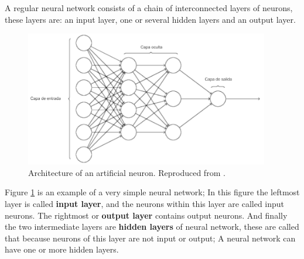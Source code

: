 A regular neural network consists of a chain of interconnected layers of neurons, these layers are: an input layer, one or several hidden layers and an output layer.

\begin{figure}[h!]
  \begin{center}	\includegraphics[width=0.95\textwidth, frame]{imagenes/Cap4/arquitectura}
  \caption{Architecture of an artificial neuron. Reproduced from \protect\cite{Reference70}.}
  \label{fig:arquitectura}
  \end{center}
\end{figure}

Figure \ref{fig:arquitectura} is an example of a very simple neural network; In this figure the leftmost layer is called \textbf{input layer}, and the neurons within this layer are called input neurons. The rightmost or \textbf{output layer} contains  output neurons. And finally the two intermediate layers are \textbf{hidden layers} of neural network, these are called that because neurons of this layer are not input or output; A neural network can have one or more hidden layers.

